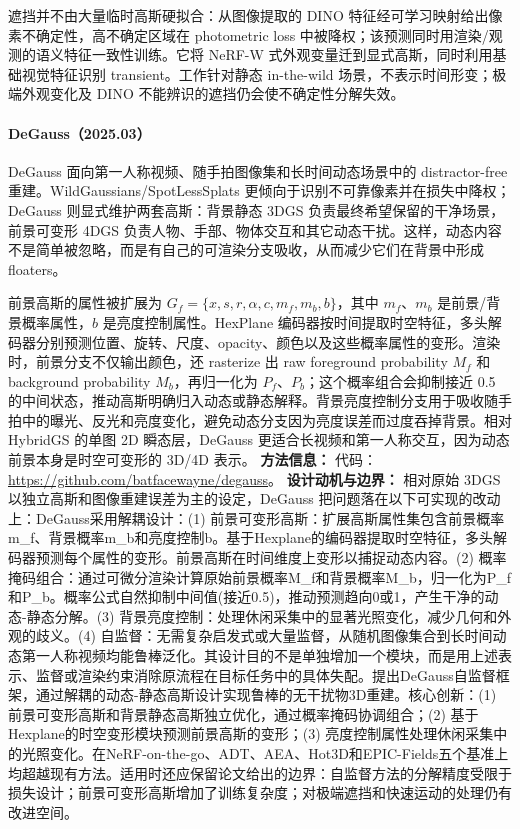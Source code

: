 遮挡并不由大量临时高斯硬拟合：从图像提取的 DINO 特征经可学习映射给出像素不确定性，高不确定区域在 photometric loss 中被降权；该预测同时用渲染/观测的语义特征一致性训练。它将 NeRF-W 式外观变量迁到显式高斯，同时利用基础视觉特征识别 transient。工作针对静态 in-the-wild 场景，不表示时间形变；极端外观变化及 DINO 不能辨识的遮挡仍会使不确定性分解失效。

\paragraph{DeGauss（2025.03）\cite{2503_13176}}
DeGauss 面向第一人称视频、随手拍图像集和长时间动态场景中的 distractor-free 重建。WildGaussians/SpotLessSplats 更倾向于识别不可靠像素并在损失中降权；DeGauss 则显式维护两套高斯：背景静态 3DGS 负责最终希望保留的干净场景，前景可变形 4DGS 负责人物、手部、物体交互和其它动态干扰。这样，动态内容不是简单被忽略，而是有自己的可渲染分支吸收，从而减少它们在背景中形成 floaters。

前景高斯的属性被扩展为 $G_f=\{x,s,r,\alpha,c,m_f,m_b,b\}$，其中 $m_f$、$m_b$ 是前景/背景概率属性，$b$ 是亮度控制属性。HexPlane 编码器按时间提取时空特征，多头解码器分别预测位置、旋转、尺度、opacity、颜色以及这些概率属性的变形。渲染时，前景分支不仅输出颜色，还 rasterize 出 raw foreground probability $M_f$ 和 background probability $M_b$，再归一化为 $P_f$、$P_b$；这个概率组合会抑制接近 0.5 的中间状态，推动高斯明确归入动态或静态解释。背景亮度控制分支用于吸收随手拍中的曝光、反光和亮度变化，避免动态分支因为亮度误差而过度吞掉背景。相对 HybridGS 的单图 2D 瞬态层，DeGauss 更适合长视频和第一人称交互，因为动态前景本身是时空可变形的 3D/4D 表示。
\textbf{方法信息：} 代码：\url{https://github.com/batfacewayne/degauss}。
\textbf{设计动机与边界：} 相对原始 3DGS 以独立高斯和图像重建误差为主的设定，DeGauss 把问题落在以下可实现的改动上：DeGauss采用解耦设计：(1) 前景可变形高斯：扩展高斯属性集包含前景概率m\_f、背景概率m\_b和亮度控制b。基于Hexplane的编码器提取时空特征，多头解码器预测每个属性的变形。前景高斯在时间维度上变形以捕捉动态内容。(2) 概率掩码组合：通过可微分渲染计算原始前景概率M\_f和背景概率M\_b，归一化为P\_f和P\_b。概率公式自然抑制中间值(接近0.5)，推动预测趋向0或1，产生干净的动态-静态分解。(3) 背景亮度控制：处理休闲采集中的显著光照变化，减少几何和外观的歧义。(4) 自监督：无需复杂启发式或大量监督，从随机图像集合到长时间动态第一人称视频均能鲁棒泛化。其设计目的不是单独增加一个模块，而是用上述表示、监督或渲染约束消除原流程在目标任务中的具体失配。提出DeGauss自监督框架，通过解耦的动态-静态高斯设计实现鲁棒的无干扰物3D重建。核心创新：(1) 前景可变形高斯和背景静态高斯独立优化，通过概率掩码协调组合；(2) 基于Hexplane的时空变形模块预测前景高斯的变形；(3) 亮度控制属性处理休闲采集中的光照变化。在NeRF-on-the-go、ADT、AEA、Hot3D和EPIC-Fields五个基准上均超越现有方法。适用时还应保留论文给出的边界：自监督方法的分解精度受限于损失设计；前景可变形高斯增加了训练复杂度；对极端遮挡和快速运动的处理仍有改进空间。
